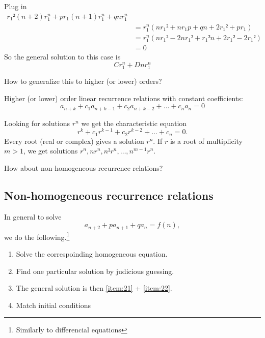 \documentclass[english]{lbscript}
\begin{document}
Plug in
\begin{align}
\label{eq:77}
r_1²(n+2)r_1^{n}+p r_1(n+1) r_1^{n} + qn r_1^{n}\\
&= r_1^{n}\left(n r_1² + n r_1p + qn + 2r_1² + p r_1 \right) \\
&= r_1^{n}\left(n r_1² - 2n r_1² + r_1²n+2r_1²-2r_1² \right) \\
&= 0
\end{align}
So the general solution to this case is
\begin{equation}
\label{eq:78}
C r_1^{n}+D n r_1^{n}
\end{equation}

How to generalize this to higher (or lower) orders?

Higher (or lower) order linear recurrence relations with constant coefficients:
\begin{equation}
\label{eq:79}
a_{n+k} + c_1 a_{n+k-1} + c_2 a_{n+k-2}+\dots+c_n a_n = 0
\end{equation}

Looking for solutions \(r^{n}\) we get the characteristic equation
\begin{equation}
\label{eq:80}
r^{k} + c_1 r^{k-1} + c_2 r^{k-2}+\dots + c_n = 0.
\end{equation}
Every root (real or complex) gives a solution \(r^{n}\). If \(r\) is a root of multiplicity \(m>1\), we get solutions \(r^{n}, n r^{n}, n² r^{n}, \dots, n^{m-1} r^{n}\).


How about non-homogeneous recurrence relations?\\

\subsection{Non-homogeneous recurrence relations}
\label{sec:non-homog-recurr}

In general to solve
\begin{equation}
\label{eq:81}
a_{n+2} + p a_{n+1} + q a_{n} = f(n),
\end{equation}
we do the following.\footnote{Similarly to differencial equations}
\begin{enumerate}[label=\arabic{*})]
\item\label{item:21} Solve the correspoinding homogeneous equation.
\item\label{item:22} Find one particular solution by judicious guessing.
\item\label{item:23} The general solution is then \ref{item:21} + \ref{item:22}.
\item\label{item:24} Match initial conditions
\end{enumerate}
\end{document}
